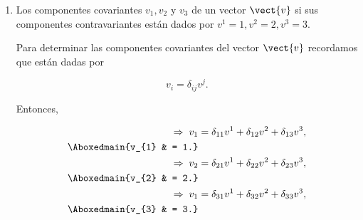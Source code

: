 \documentclass[../main.tex]{subfiles}
\begin{document}
\begin{problema}
\begin{enumerate}
		\item Los componentes covariantes \(v_{1}, v_{2}\) y \(v_{3}\) de un vector
		      \(\vect{v}\) si sus componentes contravariantes están dados por
		      \(v^{1} = 1, v^{2} = 2, v^{3} = 3\).

		      \startsolution

		      Para determinar las componentes covariantes del vector \(\vect{v}\)
		      recordamos que están dadas por

		      \begin{equation*}
			      v_{i} = \delta_{ij}v^{j}.
		      \end{equation*}

		      Entonces,

		      \begin{align*}
			      \Rightarrow\; v_{1} & = \delta_{11}v^{1} + \delta_{12}v^{2} + \delta_{13}v^{3}, \\
			      \Aboxedmain{v_{1}   & = 1.}                                                     \\
			      \Rightarrow\; v_{2} & = \delta_{21}v^{1} + \delta_{22}v^{2} + \delta_{23}v^{3}, \\
			      \Aboxedmain{v_{2}   & = 2.}                                                     \\
			      \Rightarrow\; v_{1} & = \delta_{31}v^{1} + \delta_{32}v^{2} + \delta_{33}v^{3}, \\
			      \Aboxedmain{v_{3}   & = 3.}
		      \end{align*}
	\end{enumerate}
\end{problema}
\end{document}
